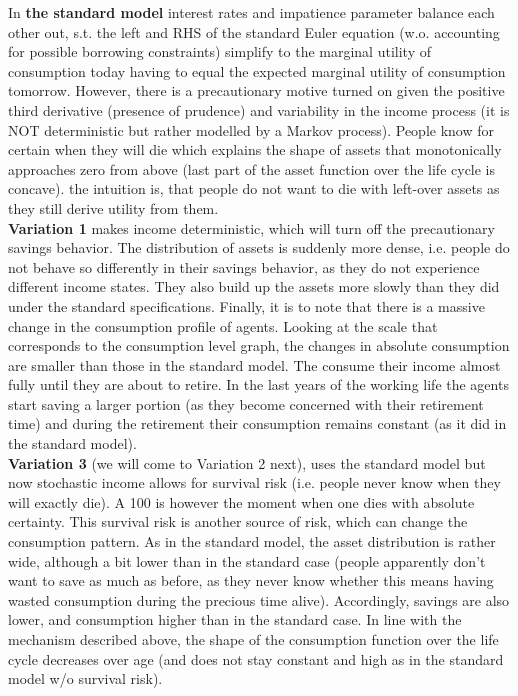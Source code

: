\documentclass[12pt,a4paper]{article}
\begin{document}
In \textbf{the standard model} interest rates and impatience parameter balance each other out, s.t. the left and RHS of the standard Euler equation (w.o. accounting for possible borrowing constraints) simplify to the marginal utility of consumption today having to equal the expected marginal utility of consumption tomorrow. However, there is a precautionary motive turned on given the positive third derivative (presence of prudence) and variability in the income process (it is NOT deterministic but rather modelled by a Markov process). People know for certain when they will die which explains the shape of assets that monotonically approaches zero from above (last part of the asset function over the life cycle is concave). the intuition is, that people do not want to die with left-over assets as they still derive utility from them. \\

\textbf{Variation 1} makes income deterministic, which will turn off the precautionary savings behavior. The distribution of assets is suddenly more dense, i.e. people do not behave so differently in their savings behavior, as they do not experience different income states. They also build up the assets more slowly than they did under the standard specifications. Finally, it is to note that there is a massive change in the consumption profile of agents. Looking at the scale that corresponds to the consumption level graph, the changes in absolute consumption are smaller than those in the standard model. The consume their income almost fully until they are about to retire. In the last years of the working life the agents start saving a larger portion (as they become concerned with their retirement time) and during the retirement their consumption remains constant (as it did in the standard model). \\

\textbf{Variation 3} (we will come to Variation 2 next), uses the standard model but now stochastic income allows for survival risk (i.e. people never know when they will exactly die). A 100 is however the moment when one dies with absolute certainty. This survival risk is another source of risk, which can change the consumption pattern. As in the standard model, the asset distribution is rather wide, although a bit lower than in the standard case (people apparently don't want to save as much as before, as they never know whether this means having wasted consumption during the precious time alive). Accordingly, savings are also lower, and consumption higher than in the standard case. In line with the mechanism described above, the shape of the consumption function over the life cycle decreases over age (and does not stay constant and high as in the standard model w/o survival risk). \\
\end{document}
